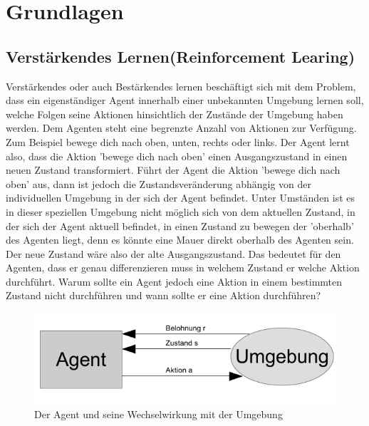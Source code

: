 \chapter{Grundlagen}
\label{ch:Grundlagen}


\section{Verstärkendes Lernen(Reinforcement Learing)}
Verstärkendes oder auch Bestärkendes lernen beschäftigt sich mit dem Problem, dass ein eigenständiger Agent innerhalb einer unbekannten Umgebung lernen soll, welche Folgen seine Aktionen hinsichtlich der Zustände der Umgebung haben werden. Dem Agenten steht eine begrenzte Anzahl von Aktionen zur Verfügung. Zum Beispiel bewege dich nach oben, unten, rechts oder links. Der Agent lernt also, dass die Aktion 'bewege dich nach oben' einen Ausgangszustand in einen neuen Zustand transformiert. Führt der Agent die Aktion 'bewege dich nach oben' aus, dann ist jedoch die Zustandsveränderung abhängig von der individuellen Umgebung in der sich der Agent befindet. Unter Umständen ist es in dieser speziellen Umgebung nicht möglich sich von dem aktuellen Zustand, in der sich der Agent aktuell befindet, in einen Zustand zu bewegen der 'oberhalb' des Agenten liegt, denn es könnte eine Mauer direkt oberhalb des Agenten sein. Der neue Zustand wäre also der alte Ausgangszustand. Das bedeutet für den Agenten, dass er genau differenzieren muss in welchem Zustand er welche Aktion durchführt. Warum sollte ein Agent jedoch eine Aktion in einem bestimmten Zustand nicht durchführen und wann sollte er eine Aktion durchführen? \\

\begin{figure}[!htbp]
  \centering
  \includegraphics[scale = 1]{inhalt/abbildungen/agent_umgebung.pdf}
  \caption{Der Agent und seine Wechselwirkung mit der Umgebung}
  \label{fig:agent_umgebung}
\end{figure} 

